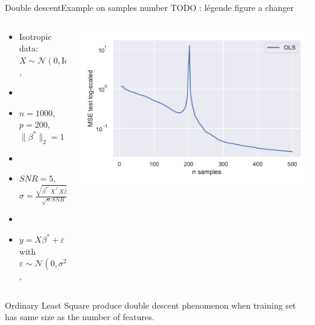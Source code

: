 \documentclass[10pt,aspectratio=43]{beamer}
\begin{document}
\begin{frame}{Double descent}{Example on samples number}
    TODO : légende figure a changer
    \begin{columns}
        \begin{column}{0.46\textwidth}
            \begin{itemize}
                \item Isotropic data: $X\sim\mathcal{N}(0,\mathrm{Id})$,
                \item[]
                \item $n=1000$, $p=200$, $\|\beta^*\|_2=1$
                \item[]
                \item $SNR = 5$, \\
                $\sigma = \frac{\sqrt{\beta^{*^\top}X^\top X \beta^{*}}}{\sqrt{n} SNR} $
                \item[]
                \item $y = X\beta^*+\varepsilon$ with $\varepsilon\sim \mathcal{N}(0, \sigma^2\mathrm{Id})$,
            \end{itemize}
        \end{column}
        \begin{column}{0.7\textwidth}
            \begin{center}
             \includegraphics[width=1\textwidth]{ols_fail_log.pdf}
             \end{center}
        \end{column}
        \end{columns}
        \begin{block}{}
            Ordinary Least Square produce double descent phenomenon when training set has same size as the number of features.
        \end{block}
\end{frame}
\end{document}
